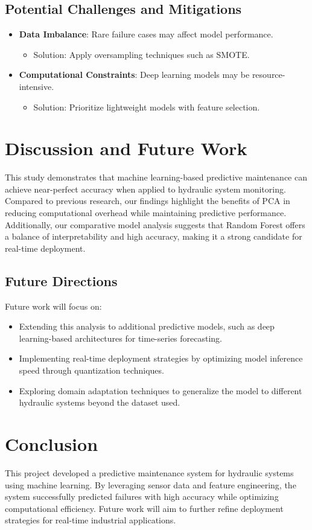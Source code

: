 \documentclass[sigconf]{acmart}
\begin{document}
\subsection{Potential Challenges and Mitigations}
\begin{itemize}
    \item \textbf{Data Imbalance}: Rare failure cases may affect model performance.
    \begin{itemize}
        \item Solution: Apply oversampling techniques such as SMOTE.
    \end{itemize}
    \item \textbf{Computational Constraints}: Deep learning models may be resource-intensive.
    \begin{itemize}
        \item Solution: Prioritize lightweight models with feature selection.
    \end{itemize}
\end{itemize}

\section{Discussion and Future Work}
This study demonstrates that machine learning-based predictive maintenance can achieve near-perfect accuracy when applied to hydraulic system monitoring. Compared to previous research, our findings highlight the benefits of PCA in reducing computational overhead while maintaining predictive performance. Additionally, our comparative model analysis suggests that Random Forest offers a balance of interpretability and high accuracy, making it a strong candidate for real-time deployment.

\subsection{Future Directions}
Future work will focus on:
\begin{itemize}
    \item Extending this analysis to additional predictive models, such as deep learning-based architectures for time-series forecasting.
    \item Implementing real-time deployment strategies by optimizing model inference speed through quantization techniques.
    \item Exploring domain adaptation techniques to generalize the model to different hydraulic systems beyond the dataset used.
\end{itemize}

\section{Conclusion}
This project developed a predictive maintenance system for hydraulic systems using machine learning. By leveraging sensor data and feature engineering, the system successfully predicted failures with high accuracy while optimizing computational efficiency. Future work will aim to further refine deployment strategies for real-time industrial applications.
\end{document}
